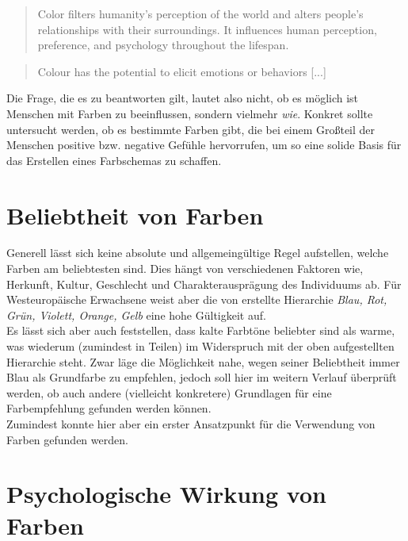 \begin{quote}
Color filters humanity’s perception of the world and alters people’s relationships with their surroundings. It influences human perception, preference, and psychology throughout the lifespan. \cite{rider2010color}
\end{quote}

\begin{quote}
Colour has the potential to elicit emotions or behaviors [...] \cite{cyr2010colour}
\end{quote}

Die Frage, die es zu beantworten gilt, lautet also nicht, ob es möglich ist Menschen mit Farben zu beeinflussen, sondern vielmehr \textit{wie}. Konkret sollte untersucht werden, ob es bestimmte Farben gibt, die bei einem Großteil der Menschen positive bzw. negative Gefühle hervorrufen, um so eine solide Basis für das Erstellen eines Farbschemas zu schaffen.


\section{Beliebtheit von Farben}

Generell lässt sich keine absolute und allgemeingültige Regel aufstellen, welche Farben am beliebtesten sind. Dies hängt von verschiedenen Faktoren wie, Herkunft, Kultur, Geschlecht und Charakterausprägung des Individuums ab. Für Westeuropäische Erwachsene weist aber die von \cite{eysenck1941critical} erstellte Hierarchie \textit{Blau, Rot, Grün, Violett, Orange, Gelb} eine hohe Gültigkeit auf. \\
Es lässt sich aber auch feststellen, dass kalte Farbtöne beliebter sind als warme, was wiederum (zumindest in Teilen) im Widerspruch mit der oben aufgestellten Hierarchie steht. 
Zwar läge die Möglichkeit nahe, wegen seiner Beliebtheit immer Blau als Grundfarbe zu empfehlen, jedoch soll hier im weitern Verlauf überprüft werden, ob auch andere (vielleicht konkretere) Grundlagen für eine Farbempfehlung gefunden werden können. \\
Zumindest konnte hier aber ein erster Ansatzpunkt für die Verwendung von Farben gefunden werden.



\section{Psychologische Wirkung von Farben}

